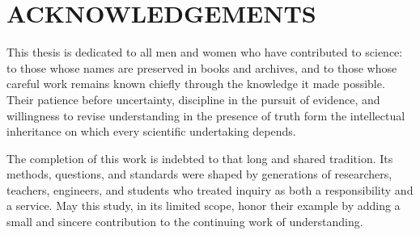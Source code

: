 \chapter*{ACKNOWLEDGEMENTS}

This thesis is dedicated to all men and women who have contributed to science: to those whose names are preserved in books and archives, and to those whose careful work remains known chiefly through the knowledge it made possible.
Their patience before uncertainty, discipline in the pursuit of evidence, and willingness to revise understanding in the presence of truth form the intellectual inheritance on which every scientific undertaking depends.

The completion of this work is indebted to that long and shared tradition.
Its methods, questions, and standards were shaped by generations of researchers, teachers, engineers, and students who treated inquiry as both a responsibility and a service.
May this study, in its limited scope, honor their example by adding a small and sincere contribution to the continuing work of understanding.